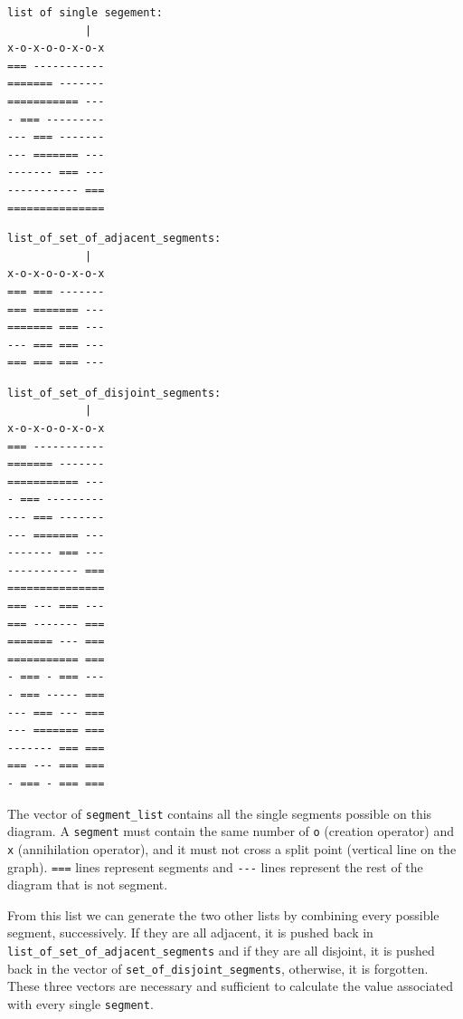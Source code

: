 \documentclass[10pt,letter]{article}
\begin{document}
\noindent\begin{minipage}[t]{.5\textwidth}
\begin{bashInput3}
\begin{lstlisting}[style=BashInputStyle]
list of single segement:
            |    
x-o-x-o-o-x-o-x
=== -----------
======= -------
=========== ---
- === ---------
--- === -------
--- ======= ---
------- === ---
----------- ===
===============
\end{lstlisting}   
\end{bashInput3}

\begin{bashInput3}
\begin{lstlisting}[style=BashInputStyle]
list_of_set_of_adjacent_segments:
            |    
x-o-x-o-o-x-o-x
=== === -------
=== ======= ---
======= === ---
--- === === ---
=== === === ---

\end{lstlisting}   
\end{bashInput3}

\end{minipage}\hfill
\begin{minipage}[t]{.5\textwidth}

\begin{bashInput3}
\begin{lstlisting}[style=BashInputStyle]
list_of_set_of_disjoint_segments:
            |    
x-o-x-o-o-x-o-x
=== -----------
======= -------
=========== ---
- === ---------
--- === -------
--- ======= ---
------- === ---
----------- ===
===============
=== --- === ---
=== ------- ===
======= --- ===
=========== ===
- === - === ---
- === ----- ===
--- === --- ===
--- ======= ===
------- === ===
=== --- === ===
- === - === ===
\end{lstlisting}   
\end{bashInput3}
\end{minipage}


The vector of \Verb#segment_list# contains all the single segments possible on this diagram. A \Verb#segment# must contain the same number of \Verb#o# (creation operator) and \Verb#x# (annihilation operator), and it must not cross a split point (vertical line on the graph). \Verb#===# lines represent segments and \Verb#---# lines represent the rest of the diagram that is not segment.

From this list we can generate the two other lists by combining every possible segment, successively. If they are all adjacent, it is pushed back in \Verb#list_of_set_of_adjacent_segments# and if they are all disjoint, it is pushed back in the vector of \Verb#set_of_disjoint_segments#, otherwise, it is forgotten. These three vectors are necessary and sufficient to calculate the value associated with every single \Verb#segment#.
\end{document}
